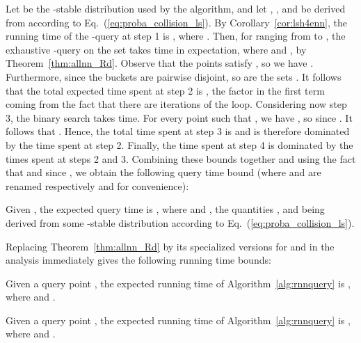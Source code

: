 Let  be the -stable distribution used by the algorithm, and let
, ,  and
 be derived from 
according to Eq.~(\ref{eq:proba_collision_ls}). By
Corollary~\ref{cor:lsh4enn}, the running time of the -\nn query at
step 1 is ,
where . Then, for  ranging from
 to
, the
exhaustive -\pleb query on the set  takes  time in
expectation, where  and , by Theorem~\ref{thm:allnn_Rd}.
Observe that the points  satisfy
, so we have
. Furthermore, since the buckets  are
pairwise disjoint, so are the sets . It
follows that the total expected time spent at step 2 is , the factor
 in the first term coming from the fact that there are
 iterations of the loop.  Considering now step
3, the binary search takes  time.  For
every point  such that , we have , so  since . It follows that . Hence,
the total time spent at step 3 is  and is therefore dominated by the time spent
at step 2.  Finally, the time spent at step 4 is dominated by the
times spent at steps 2 and 3. Combining these bounds together and
using the fact that  and  since
, we obtain the following
query time bound (where  and  are renamed respectively
 and  for convenience):
\begin{thm}\label{thm:rnnquerytime}
Given , the expected query time is
, where  and
, the quantities
,  and
 being derived from some
-stable distribution  according to
Eq.~(\ref{eq:proba_collision_ls}).
\end{thm}
Replacing Theorem~\ref{thm:allnn_Rd} by its specialized versions for
 and  in the analysis immediately gives the following
running time bounds:
\addtocounter{thm}{-1}
\begin{thm}[case ]\label{thm:rnnquerytime_l1}
Given a query point , the expected running time
of Algorithm~\ref{alg:rnnquery} is ,
where  and
.
\end{thm}
\addtocounter{thm}{-1}
\begin{thm}[case ]\label{thm:rnnquerytime_l2}
Given a query point , the expected running time
of Algorithm~\ref{alg:rnnquery} is ,
where  and
.
\end{thm}


